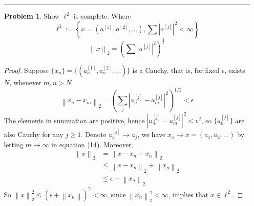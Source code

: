 \documentclass[a4paper, 10pt]{article}
\theoremstyle{definition}
\newtheorem{problem}{Problem}
\theoremstyle{hSol}
\begin{document}
\noindent\rule{16cm}{0.4pt}
\begin{problem} Show $\ell^2$ is complete. Where
$$\ell^2 := \left\{x=(a^{[1]}, a^{[2]}, ...), \sum |a^{[j]}|^2 < \infty \right\}$$
$$\left\|x\right\|_2=\left(\sum |a^{[j]}|^2\right)^{\frac{1}{2}}$$
\end{problem}
\begin{proof} Suppose $\{x_n\}=\{(a_{n}^{[1]}, a_{n}^{[2]},...)\}$ is a Cauchy, that is, for fixed $\epsilon$, exists $N$, whenever $m,n>N$
\begin{equation}
	\left\|x_n - x_m\right\|_2 = \left(\sum_{j} |a_n^{[j]}-a_m^{[j]}|^2\right)^{1/2} < \epsilon
\end{equation}
The elements in summation are positive, hence $|a_n^{[j]}-a_m^{[j]}|^2<\epsilon^2$, so $\{a^{[j]}_n\}$ are also Cauchy for any $j\geq 1$. Denote $a^{[j]}_n \to a_j$, we have $x_n \to x=(a_1, a_2, ...)$ by letting $m\to \infty$ in equation (14). Moreover,
\begin{equation}
	\begin{split}
		\left\|x\right\|_2 &= \left\|x - x_n + x_n\right\|_2 \\
		&\leq \left\|x-x_n\right\|_2 + \left\|x_n\right\|_2 \\
		&\leq \epsilon + \left\|x_n\right\|_2
	\end{split}
\end{equation}
So $\left\|x\right\|_2^2 \leq (\epsilon+\left\|x_n\right\|)^2 < \infty$, since $\left\|x_n\right\|_2^2 < \infty$, implies that $x\in \ell^2$.
\end{proof}
\end{document}
